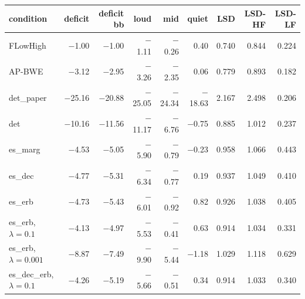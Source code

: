 \begin{tabular}{lrrrrrrrr}
\toprule
condition & deficit & deficit bb & loud & mid & quiet & LSD & LSD-HF & LSD-LF \\
\midrule
FLowHigh & $-$1.00 & $-$1.00 & $-$1.11 & $-$0.26 & 0.40 & 0.740 & 0.844 & 0.224 \\
AP-BWE & $-$3.12 & $-$2.95 & $-$3.26 & $-$2.35 & 0.06 & 0.779 & 0.893 & 0.182 \\
det\_paper & $-$25.16 & $-$20.88 & $-$25.05 & $-$24.34 & $-$18.63 & 2.167 & 2.498 & 0.206 \\
det & $-$10.16 & $-$11.56 & $-$11.17 & $-$6.76 & $-$0.75 & 0.885 & 1.012 & 0.237 \\
es\_marg & $-$4.53 & $-$5.05 & $-$5.90 & $-$0.79 & $-$0.23 & 0.958 & 1.066 & 0.443 \\
es\_dec & $-$4.77 & $-$5.31 & $-$6.34 & $-$0.77 & 0.19 & 0.937 & 1.049 & 0.410 \\
es\_erb & $-$4.73 & $-$5.43 & $-$6.01 & $-$0.92 & 0.82 & 0.926 & 1.038 & 0.405 \\
es\_erb, $\lambda{=}0.1$ & $-$4.13 & $-$4.97 & $-$5.53 & $-$0.41 & 0.63 & 0.914 & 1.034 & 0.331 \\
es\_erb, $\lambda{=}0.001$ & $-$8.87 & $-$7.49 & $-$9.90 & $-$5.44 & $-$1.18 & 1.029 & 1.118 & 0.629 \\
es\_dec\_erb, $\lambda{=}0.1$ & $-$4.26 & $-$5.19 & $-$5.66 & $-$0.51 & 0.34 & 0.914 & 1.033 & 0.340 \\
\bottomrule
\end{tabular}

